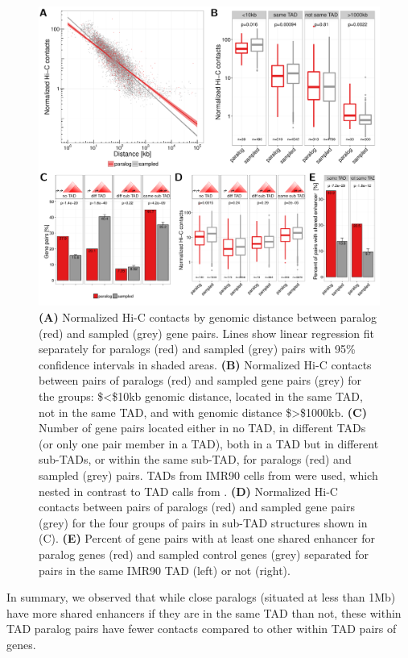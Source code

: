\documentclass[a4paper,twoside=true,openright,parskip=full,chapterprefix=true,11pt,headings=normal,bibliography=totoc,listof=totoc,titlepage=on,captions=tableabove,draft=false]{scrreprt}
\theoremstyle{definition}
\theoremstyle{definition}
\theoremstyle{definition}
\theoremstyle{remark}
\begin{document}
\begin{figure}

{\centering \includegraphics[width=0.5\linewidth]{figures/paralog/fig4_09} 

}

\caption{\textbf{(A)} Normalized Hi-C contacts by genomic
distance between paralog (red) and sampled (grey) gene pairs. Lines show
linear regression fit separately for paralogs (red) and sampled (grey)
pairs with 95\% confidence intervals in shaded areas. \textbf{(B)}
Normalized Hi-C contacts between pairs of paralogs (red) and sampled
gene pairs (grey) for the groups: \$\textless{}\$10kb genomic distance,
located in the same TAD, not in the same TAD, and with genomic distance
\$\textgreater{}\$1000kb. \textbf{(C)} Number of gene pairs located
either in no TAD, in different TADs (or only one pair member in a TAD),
both in a TAD but in different sub-TADs, or within the same sub-TAD, for
paralogs (red) and sampled (grey) pairs. TADs from IMR90 cells from
\citep{Rao2014} were used, which nested in contrast to TAD calls from
\citep{Dixon2012}. \textbf{(D)} Normalized Hi-C contacts between pairs
of paralogs (red) and sampled gene pairs (grey) for the four groups of
pairs in sub-TAD structures shown in (C). \textbf{(E)} Percent of gene
pairs with at least one shared enhancer for paralog genes (red) and
sampled control genes (grey) separated for pairs in the same IMR90 TAD
(left) or not (right).}\label{fig:closePairs}
\end{figure}




















In summary, we observed that while close paralogs (situated at less than
1Mb) have more shared enhancers if they are in the same TAD than not,
these within TAD paralog pairs have fewer contacts compared to other
within TAD pairs of genes.
\end{document}
